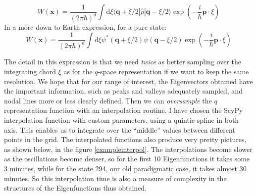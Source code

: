 \documentclass[a4paper,12pt]{article}
\newcommand{\ihb}{\frac{i}{\hbar}}
\newcommand{\xfase}{\mathbf{x}}
\newcommand{\qfase}{\mathbf{q}}
\newcommand{\pfase}{\mathbf{p}}
\newcommand{\bra}[1]{\langle #1|}
\newcommand{\ket}[1]{|#1\rangle}
\newcommand{\rd}{\!\mathrm{d}}
\begin{document}
\begin{equation}
  W(\xfase)=\frac{1}{(2\pi\hbar)^d}\int \rd \xi \bra{\qfase 
    +\xi/2}\hat{\rho}\ket{\qfase-\xi/2}\exp(-\ihb \pfase \cdot \xi) 
\end{equation}
In a more down to Earth  expression, for a pure state:
\begin{equation}
  W(\xfase)=\frac{1}{(2\pi\hbar)^d}\int \rd \xi \psi^*(\qfase 
  +\xi/2)\psi(\qfase-\xi/2)\exp(-\ihb \pfase \cdot \xi) 
\end{equation}

The detail in this expression is that we need \emph{twice} as better
sampling over the integrating chord $\xi$ as for the $q$-space representation
if we want to keep the same resolution. We hope that for our range of interest,
the Eigenvectors obtained have the important information, such as peaks and 
valleys adequately sampled, and nodal lines more or less clearly defined. 
Then we can \emph{oversample} the $q$ representation function with an
interpolation routine. I have chosen the ScyPy interpolation function 
with custom parameters, using a quintic spline in both axis. This enables us to 
integrate over the ``middle'' values between different points in the grid. 
The interpolated functions also produce very pretty pictures, as shown below, in 
the figure \ref{exampleinterpol}. The interpolations become slower
as the oscillations become denser, so for the first 10 Eigenfunctions it takes
some 3 minutes, while for the state 294, our old paradigmatic case, it
takes almost 30 minutes. So this interpolation time is also a measure
of complexity in the structures of the Eigenfunctions thus obtained. 
\end{document}
